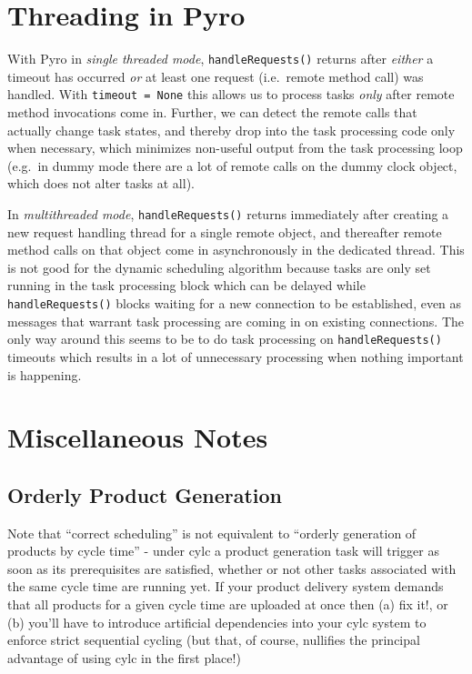 \documentclass[11pt,a4paper]{article}
\begin{document}
\section{Threading in Pyro} \label{pyro-appendix}

With Pyro in {\em single threaded mode}, \verb#handleRequests()# returns
after {\em either} a timeout has occurred {\em or} at least one request
(i.e.\ remote method call) was handled. With \verb#timeout = None# this
allows us to process tasks {\em only} after remote method invocations
come in.  Further, we can detect the remote calls that actually change
task states, and thereby drop into the task processing code only when
necessary, which minimizes non-useful output from the task processing
loop (e.g.\ in dummy mode there are a lot of remote calls on the dummy
clock object, which does not alter tasks at all). 

In {\em multithreaded mode}, \verb#handleRequests()# returns immediately
after creating a new request handling thread for a single remote object,
and thereafter remote method calls on that object come in asynchronously
in the dedicated thread. This is not good for the dynamic scheduling
algorithm because tasks are only set running in the task processing
block which can be delayed while \verb#handleRequests()# blocks waiting
for a new connection to be established, even as messages that warrant
task processing are coming in on existing connections. The only way
around this seems to be to do task processing on \verb#handleRequests()#
timeouts which results in a lot of unnecessary processing when nothing
important is happening.


\section{Miscellaneous Notes}

\subsection{Orderly Product Generation}

Note that ``correct scheduling'' is not equivalent to ``orderly
generation of products by cycle time'' - under cylc a product
generation task will trigger as soon as its prerequisites are satisfied,
whether or not other tasks associated with the same cycle time are
running yet.  If your product delivery system demands that all products
for a given cycle time are uploaded at once then (a) fix it!, or (b)
you'll have to introduce artificial dependencies into your cylc system
to enforce strict sequential cycling (but that, of course, nullifies the
principal advantage of using cylc in the first place!)
\end{document}
